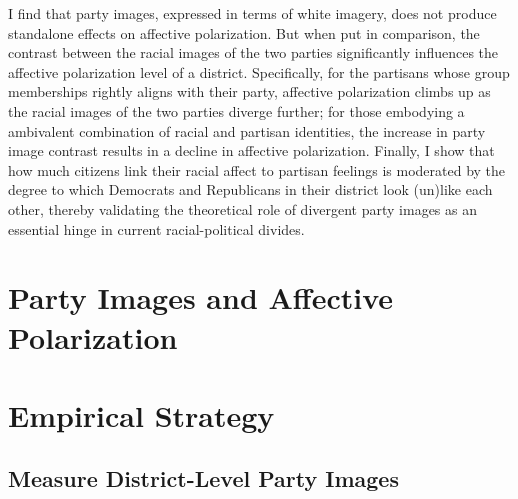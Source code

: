 \documentclass[
  12pt,
]{article}
\begin{document}
I find that party images, expressed in terms of white imagery, does not
produce standalone effects on affective polarization. But when put in
comparison, the contrast between the racial images of the two parties
significantly influences the affective polarization level of a district.
Specifically, for the partisans whose group memberships rightly aligns
with their party, affective polarization climbs up as the racial images
of the two parties diverge further; for those embodying a ambivalent
combination of racial and partisan identities, the increase in party
image contrast results in a decline in affective polarization. Finally,
I show that how much citizens link their racial affect to partisan
feelings is moderated by the degree to which Democrats and Republicans
in their district look (un)like each other, thereby validating the
theoretical role of divergent party images as an essential hinge in
current racial-political divides.

\hypertarget{party-images-and-affective-polarization}{%
\section{Party Images and Affective
Polarization}\label{party-images-and-affective-polarization}}

\hypertarget{empirical-strategy}{%
\section{Empirical Strategy}\label{empirical-strategy}}

\hypertarget{measure-district-level-party-images}{%
\subsection{Measure District-Level Party
Images}\label{measure-district-level-party-images}}
\end{document}
